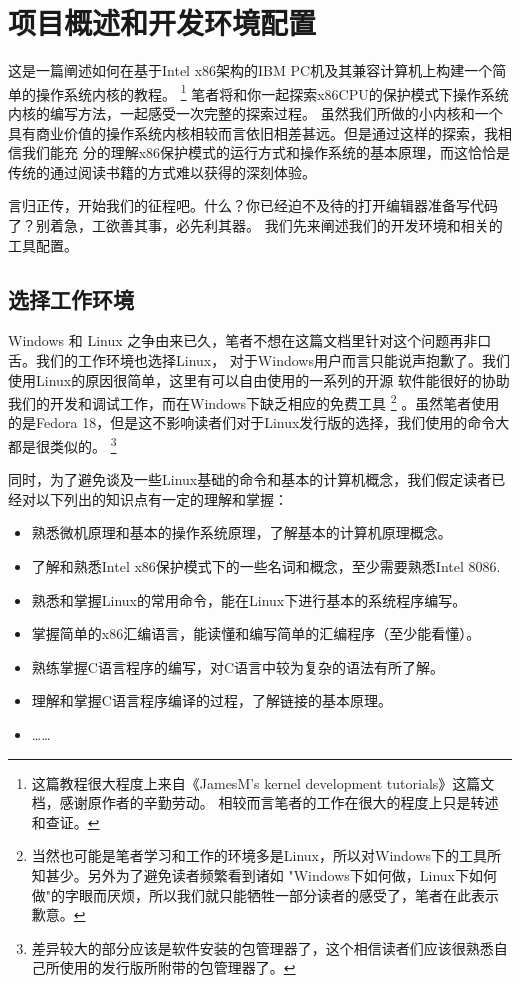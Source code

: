 
\section{项目概述和开发环境配置}

\par 这是一篇阐述如何在基于Intel x86架构的IBM PC机及其兼容计算机上构建一个简单的操作系统内核的教程。\allowbreak
\footnote{这篇教程很大程度上来自《JamesM's kernel development tutorials》这篇文档，感谢原作者的辛勤劳动。\allowbreak
相较而言笔者的工作在很大的程度上只是转述和查证。}
笔者将和你一起探索x86CPU的保护模式下操作系统内核的编写方法，一起感受一次完整的探索过程。\allowbreak
虽然我们所做的小内核和一个具有商业价值的操作系统内核相较而言依旧相差甚远。但是通过这样的探索，我相信我们能充\allowbreak
分的理解x86保护模式的运行方式和操作系统的基本原理，而这恰恰是传统的通过阅读书籍的方式难以获得的深刻体验。

\par 言归正传，开始我们的征程吧。什么？你已经迫不及待的打开编辑器准备写代码了？别着急，工欲善其事，必先利其器。\allowbreak
我们先来阐述我们的开发环境和相关的工具配置。

\subsection{选择工作环境}
\par Windows 和 Linux 之争由来已久，笔者不想在这篇文档里针对这个问题再非口舌。我们的工作环境也选择Linux，\allowbreak
对于Windows用户而言只能说声抱歉了。我们使用Linux的原因很简单，这里有可以自由使用的一系列的开源\allowbreak
软件能很好的协助我们的开发和调试工作，而在Windows下缺乏相应的免费工具\allowbreak
\footnote {当然也可能是笔者学习和工作的环境多是Linux，所以对Windows下的工具所知甚少。另外为了避免读者频繁看到诸如\allowbreak
"Windows下如何做，Linux下如何做"的字眼而厌烦，所以我们就只能牺牲一部分读者的感受了，笔者在此表示歉意。}
。虽然笔者使用的是Fedora 18，但是这不影响读者们对于Linux发行版的选择，我们使用的命令大都是很类似的。\allowbreak
\footnote {差异较大的部分应该是软件安装的包管理器了，这个相信读者们应该很熟悉自己所使用的发行版所附带的包管理器了。}

\par 同时，为了避免谈及一些Linux基础的命令和基本的计算机概念，我们假定读者已经对以下列出的知识点有一定的理解和掌握：
\begin{itemize}
	\item 熟悉微机原理和基本的操作系统原理，了解基本的计算机原理概念。
	\item 了解和熟悉Intel x86保护模式下的一些名词和概念，至少需要熟悉Intel 8086.
	\item 熟悉和掌握Linux的常用命令，能在Linux下进行基本的系统程序编写。
	\item 掌握简单的x86汇编语言，能读懂和编写简单的汇编程序（至少能看懂）。
	\item 熟练掌握C语言程序的编写，对C语言中较为复杂的语法有所了解。
	\item 理解和掌握C语言程序编译的过程，了解链接的基本原理。
	\item ……
\end{itemize}

